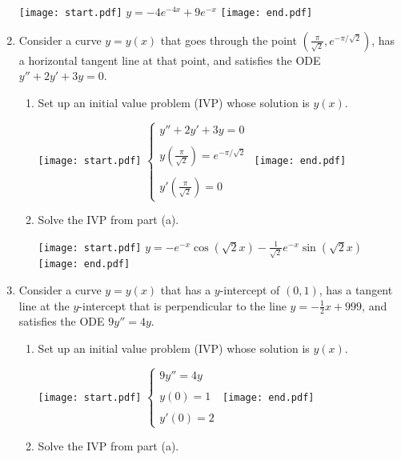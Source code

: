 \documentclass[12pt]{article}
\begin{document}
\begin{enumerate}
\texttt{[image: start.pdf]}
{{$y=-4e^{-4x}+9e^{-x}$}}
\texttt{[image: end.pdf]}


\item Consider a curve $y=y(x)$ that goes through the point $\left(\frac{\pi}{\sqrt{2}},e^{-\pi/\sqrt{2}}\right)$, has a horizontal tangent line at that point, and satisfies the ODE 
$y''+2y'+3y=0$.

\begin{enumerate}

\item Set up an initial value problem (IVP) whose solution is $y(x)$.

\texttt{[image: start.pdf]}
{{$\left\{\begin{array}{l}
y''+2y'+3y=0
\\ \\
y\left(\frac{\pi}{\sqrt{2}}\right)=e^{-\pi/\sqrt{2}}
\\ \\
y'\left(\frac{\pi}{\sqrt{2}}\right)=0
\end{array}\right.$}}
\texttt{[image: end.pdf]}


\item Solve the IVP from part (a).

\texttt{[image: start.pdf]}
{{$y=-e^{-x}\cos\left(\sqrt{2}x\right)-\frac{1}{\sqrt{2}}e^{-x}\sin\left(\sqrt{2}x\right)$}}
\texttt{[image: end.pdf]}


\end{enumerate}

\item Consider a curve $y=y(x)$ that has a $y$-intercept of $(0,1)$, has a tangent line at the $y$-intercept that is perpendicular to the line $y=-\frac{1}{2}x+999$, and satisfies the ODE 
$9y''=4y$.

\begin{enumerate}

\item Set up an initial value problem (IVP) whose solution is $y(x)$.

\texttt{[image: start.pdf]}
{{$\left\{\begin{array}{l}
9y''=4y
\\ \\
y(0)=1
\\ \\
y'(0)=2
\end{array}\right.$}}
\texttt{[image: end.pdf]}


\item Solve the IVP from part (a).


\end{enumerate}
\end{enumerate}
\end{document}
